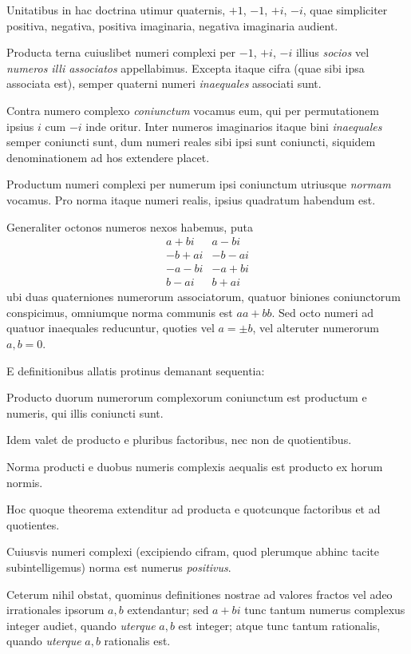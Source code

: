 %
Unitatibus in hac doctrina utimur quaternis, $+1$, $-1$, $+i$, $-i$, quae simpliciter positiva, negativa, positiva imaginaria, negativa imaginaria audient.

Producta terna cuiuslibet numeri complexi per $-1$, $+i$, $-i$ illius \emph{socios} vel \emph{numeros illi associatos} appellabimus. Excepta itaque cifra (quae sibi ipsa associata est), semper quaterni numeri \emph{inaequales} associati sunt.

Contra numero complexo \emph{coniunctum} vocamus eum, qui per permutationem ipsius $i$ cum $-i$ inde oritur. Inter numeros imaginarios itaque bini \emph{inaequales} semper coniuncti sunt, dum numeri reales sibi ipsi sunt coniuncti, siquidem denominationem ad hos extendere placet.

Productum numeri complexi per numerum ipsi coniunctum utriusque \emph{normam} vocamus. Pro norma itaque numeri realis, ipsius quadratum habendum est.

Generaliter octonos numeros nexos habemus, puta
\[
\begin{array}{r|r}
a+bi&a-bi\\
-b+ai&-b-ai\\
-a-bi&-a+bi\\
b-ai&b+ai
\end{array}
\]
ubi duas quaterniones numerorum associatorum, quatuor biniones coniunctorum conspicimus, omniumque norma communis est $aa+bb$. Sed octo numeri ad quatuor inaequales reducuntur, quoties vel $a=\pm b$, vel alteruter numerorum $a,b=0$.

E definitionibus allatis protinus demanant sequentia:

Producto duorum numerorum complexorum coniunctum est productum e numeris, qui illis coniuncti sunt.

Idem valet de producto e pluribus factoribus, nec non de quotientibus.

Norma producti e duobus numeris complexis aequalis est producto ex horum normis.

Hoc quoque theorema extenditur ad producta e quotcunque factoribus et ad quotientes.

Cuiusvis numeri complexi (excipiendo cifram, quod plerumque abhinc tacite subintelligemus) norma est numerus \emph{positivus}.

Ceterum nihil obstat, quominus definitiones nostrae ad valores fractos vel adeo irrationales ipsorum $a,b$ extendantur; sed $a+bi$ tunc tantum numerus complexus integer audiet, quando \emph{uterque} $a,b$ est integer; atque tunc tantum rationalis, quando \emph{uterque} $a,b$ rationalis est.

